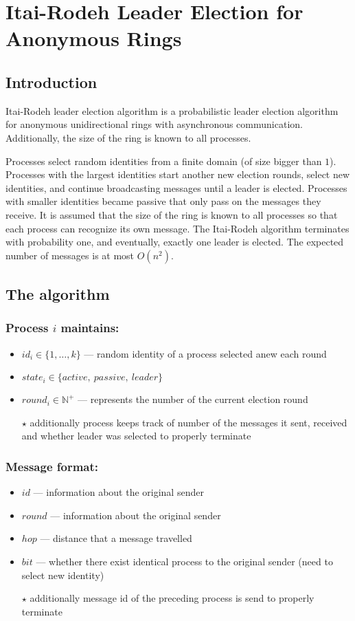 \documentclass{article}
\begin{document}
\section*{Itai-Rodeh Leader Election for Anonymous Rings}

\subsection*{Introduction}
Itai-Rodeh leader election algorithm is a probabilistic leader election algorithm for anonymous unidirectional rings with asynchronous communication. Additionally, the size of the ring is known to all processes.

Processes select random identities from a finite domain (of size bigger than $1$). Processes with the largest identities start another new election rounds, select new identities, and continue broadcasting messages until a leader is elected. Processes with smaller identities became passive that only pass on the messages they receive. It is assumed that the size of the ring is known to all processes so that each process can recognize its own message. The Itai-Rodeh algorithm terminates with probability one, and eventually, exactly one leader is elected. The expected number of messages is at most $O(n^2)$.

\subsection*{The algorithm}
\subsubsection*{Process $i$ maintains:}
\begin{itemize}
    \item $id_i \in \{1, \ldots , k\}$ --- random identity of a process selected anew each round
    \item $state_i \in \{active,\ passive,\ leader\}$
    \item $round_i \in \mathbb{N}^+$ --- represents the number of the current election round
    \item[$\star$] additionally process keeps track of number of the messages it sent, received and whether leader was selected to properly terminate
\end{itemize}

\subsubsection*{Message format:}
\begin{itemize}
    \item $id$ --- information about the original sender
    \item $round$ --- information about the original sender
    \item $hop$ --- distance that a message travelled
    \item $bit$ --- whether there exist identical process to the original sender (need to select new identity)
    \item[$\star$] additionally message id of the preceding process is send to properly terminate
\end{itemize}
\end{document}
